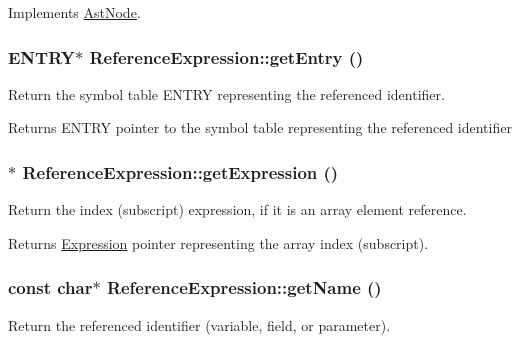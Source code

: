 Implements \hyperlink{classAstNode_a67b2d6ce1262da2954fb4db255759fb3}{AstNode}.\hypertarget{classReferenceExpression_aaa972751c0253013518547cf6efaa513}{
\subsubsection[{getEntry}]{\setlength{\rightskip}{0pt plus 5cm}ENTRY$\ast$ ReferenceExpression::getEntry ()}}
\label{classReferenceExpression_aaa972751c0253013518547cf6efaa513}
Return the symbol table ENTRY representing the referenced identifier.

\begin{DoxyReturn}{Returns}
ENTRY pointer to the symbol table representing the referenced identifier 
\end{DoxyReturn}
\hypertarget{classReferenceExpression_a88b28a401551edd1cd4462df16ce8a51}{
\subsubsection[{getExpression}]{$\ast$ ReferenceExpression::getExpression ()}}
\label{classReferenceExpression_a88b28a401551edd1cd4462df16ce8a51}
Return the index (subscript) expression, if it is an array element reference.

\begin{DoxyReturn}{Returns}
\hyperlink{classExpression}{Expression} pointer representing the array index (subscript). 
\end{DoxyReturn}
\hypertarget{classReferenceExpression_a5a5123067be08b29efb72db0a3c59ec0}{
\subsubsection[{getName}]{\setlength{\rightskip}{0pt plus 5cm}const char$\ast$ ReferenceExpression::getName ()}}
\label{classReferenceExpression_a5a5123067be08b29efb72db0a3c59ec0}
Return the referenced identifier (variable, field, or parameter).

